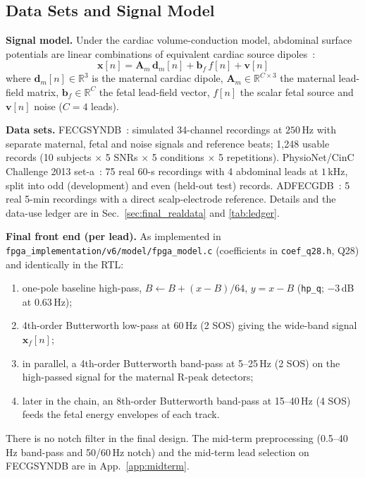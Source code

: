 \begin{finalpart}
\section{Data Sets and Signal Model}
\label{sec:dataset}
\noindent\textbf{Signal model.} Under the cardiac volume-conduction model, abdominal surface potentials are linear combinations of equivalent cardiac source dipoles~\cite{sornmo_ecg,sameni2010}:
\begin{equation}
    \mathbf{x}[n] = \mathbf{A}_m\,\mathbf{d}_m[n] + \mathbf{b}_f\,f[n] + \mathbf{v}[n]
\end{equation}
where $\mathbf{d}_m[n] \in \mathbb{R}^3$ is the maternal cardiac dipole, $\mathbf{A}_m \in \mathbb{R}^{C \times 3}$ the maternal lead-field matrix, $\mathbf{b}_f \in \mathbb{R}^C$ the fetal lead-field vector, $f[n]$ the scalar fetal source and $\mathbf{v}[n]$ noise ($C = 4$ leads).

\noindent\textbf{Data sets.} FECGSYNDB~\cite{fecgsyndb,andreotti2016}: simulated 34-channel recordings at $250\,$Hz with separate maternal, fetal and noise signals and reference beats; 1,248 usable records (10 subjects $\times$ 5 SNRs $\times$ 5 conditions $\times$ 5 repetitions). PhysioNet/CinC Challenge 2013 set-a~\cite{silva2013}: 75 real 60-s recordings with 4 abdominal leads at $1\,$kHz, split into odd (development) and even (held-out test) records. ADFECGDB~\cite{jezewski2012}: 5 real 5-min recordings with a direct scalp-electrode reference. Details and the data-use ledger are in Sec.~\ref{sec:final_realdata} and \cref{tab:ledger}.

\noindent\textbf{Final front end (per lead).} As implemented in \texttt{fpga\_implementation/v6/model/fpga\_model.c} (coefficients in \texttt{coef\_q28.h}, Q28) and identically in the RTL:
\begin{enumerate}
    \item one-pole baseline high-pass, $B \leftarrow B + (x - B)/64$, $y = x - B$ (\texttt{hp\_q}; $-3\,$dB at $0.63\,$Hz);
    \item 4th-order Butterworth low-pass at $60\,$Hz (2 SOS) giving the wide-band signal $\mathbf{x}_f[n]$;
    \item in parallel, a 4th-order Butterworth band-pass at 5--25\,Hz (2 SOS) on the high-passed signal for the maternal R-peak detectors;
    \item later in the chain, an 8th-order Butterworth band-pass at 15--40\,Hz (4 SOS) feeds the fetal energy envelopes of each track.
\end{enumerate}
There is no notch filter in the final design. The mid-term preprocessing (0.5--40\,Hz band-pass and 50/60\,Hz notch) and the mid-term lead selection on FECGSYNDB are in App.~\ref{app:midterm}.
\end{finalpart}
